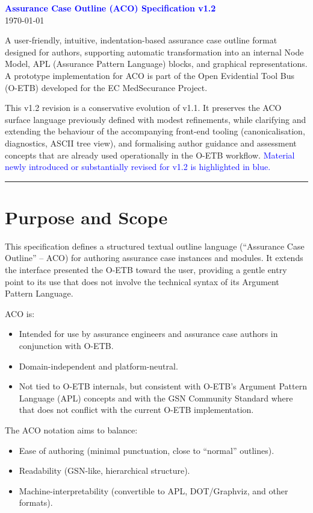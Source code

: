 \documentclass[11pt]{article}
\begin{document}
\begin{center}
{\LARGE \textbf{\textcolor{blue}{Assurance Case Outline (ACO) Specification v1.2}}}\\[0.5em]
\today
\end{center}

A user-friendly, intuitive, indentation-based assurance case outline format designed for authors, supporting automatic transformation into an internal Node Model, APL (Assurance Pattern Language) blocks, and graphical representations.
A prototype implementation for ACO is part of the Open Evidential Tool Bus (O-ETB) developed for the EC MedSecurance Project.

This v1.2 revision is a conservative evolution of v1.1. It preserves the ACO surface language previously defined with modest refinements, while clarifying and extending the behaviour of the accompanying front-end tooling (canonicalisation, diagnostics, ASCII tree view), and formalising author guidance and assessment concepts that are already used operationally in the O-ETB workflow.
\textcolor{blue}{Material newly introduced or substantially revised for v1.2 is highlighted in blue.}

\bigskip
\hrule
\bigskip

\section{Purpose and Scope}

This specification defines a structured textual outline language (``Assurance Case Outline'' -- ACO) for authoring assurance case instances and modules. It extends the interface presented the O-ETB toward the user, providing a gentle entry point to its use that does not involve the technical syntax of its Argument Pattern Language.

ACO is:
\begin{itemize}[leftmargin=2em]
  \item Intended for use by assurance engineers and assurance case authors in conjunction with O-ETB.
  \item Domain-independent and platform-neutral.
  \item Not tied to O-ETB internals, but consistent with O-ETB's Argument Pattern Language (APL) concepts and with the GSN Community Standard where that does not conflict with the current O-ETB implementation.
\end{itemize}

The ACO notation aims to balance:
\begin{itemize}[leftmargin=2em]
  \item Ease of authoring (minimal punctuation, close to ``normal'' outlines).
  \item Readability (GSN-like, hierarchical structure).
  \item Machine-interpretability (convertible to APL, DOT/Graphviz, and other formats).
\end{itemize}
\end{document}
